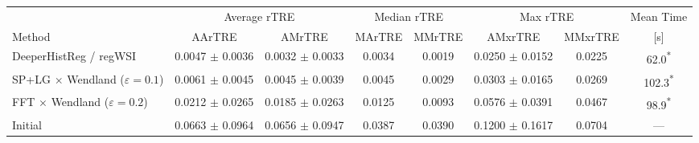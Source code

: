\begin{tabular}{@{}lccccccc@{}}
    \toprule
    & \multicolumn{2}{c}{Average rTRE} & \multicolumn{2}{c}{Median rTRE} & \multicolumn{2}{c}{Max rTRE} & Mean Time \\
    \cmidrule(lr){2-3}\cmidrule(lr){4-5}\cmidrule(lr){6-7}
    Method & AArTRE & AMrTRE & MArTRE & MMrTRE & AMxrTRE & MMxrTRE & [s] \\
    \midrule
    DeeperHistReg / regWSI & 0.0047 $\pm$ 0.0036 & 0.0032 $\pm$ 0.0033 & 0.0034 & 0.0019 & 0.0250 $\pm$ 0.0152 & 0.0225 & 62.0\textsuperscript{*} \\
    SP+LG $\times$ Wendland ($\varepsilon=0.1$) & 0.0061 $\pm$ 0.0045 & 0.0045 $\pm$ 0.0039 & 0.0045 & 0.0029 & 0.0303 $\pm$ 0.0165 & 0.0269 & 102.3\textsuperscript{*} \\
    FFT $\times$ Wendland ($\varepsilon=0.2$) & 0.0212 $\pm$ 0.0265 & 0.0185 $\pm$ 0.0263 & 0.0125 & 0.0093 & 0.0576 $\pm$ 0.0391 & 0.0467 & 98.9\textsuperscript{*} \\
    Initial & 0.0663 $\pm$ 0.0964 & 0.0656 $\pm$ 0.0947 & 0.0387 & 0.0390 & 0.1200 $\pm$ 0.1617 & 0.0704 & --- \\
    \bottomrule
\end{tabular}
